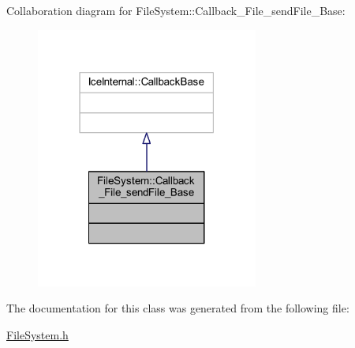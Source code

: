 Collaboration diagram for File\+System\+:\+:Callback\+\_\+\+File\+\_\+send\+File\+\_\+\+Base\+:
\nopagebreak
\begin{figure}[H]
\begin{center}
\leavevmode
\includegraphics[width=207pt]{class_file_system_1_1_callback___file__send_file___base__coll__graph}
\end{center}
\end{figure}


The documentation for this class was generated from the following file\+:\begin{DoxyCompactItemize}
\item 
\hyperlink{_file_system_8h}{File\+System.\+h}\end{DoxyCompactItemize}
